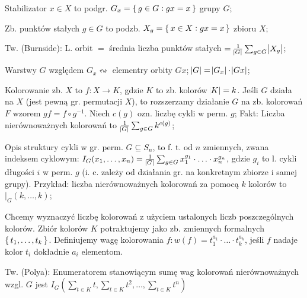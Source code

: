 Stabilizator $x \in X$ to podgr. $G_x = \set{g\in G: gx = x}$ grupy $G$;

Zb. punktów stałych $g \in G$ to podzb. $X_g = \set{x\in X: gx=x}$ zbioru $X$;

Tw. (Burnside): L. orbit $=$ średnia liczba punktów stałych
  $=\frac{1}{\abs{G}}\sum_{g\in G}\abs{X_g}$;

Warstwy $G$ względem $G_x \leftrightsquigarrow$ elementry orbity $Gx$;
$\abs{G} = \abs{G_x} \cdot \abs{Gx}$;

Kolorowanie zb. $X$ to $f: X\rightarrow K$, gdzie $K$ to zb. kolorów
  $\abs{K} = k$. Jeśli $G$ działa na $X$ (jest pewną gr. permutacji $X$), to
  rozszerzamy działanie $G$ na zb. kolorowań $F$ wzorem $gf=f\circ g^{-1}$.
  Niech $c(g)$ ozn. liczbę cykli w perm. $g$; Fakt: Liczba nierównoważnych
  kolorowań to $\frac{1}{\abs{G}}\sum_{g\in G}k^{c(g)}$;

Opis struktury cykli w gr. perm. $G \subseteq S_n$, to f. t. od $n$ zmiennych,
  zwana indeksem cyklowym: $I_G(x_1,\ldots,x_n)=
  \frac{1}{\abs{G}}\sum_{g\in G}x_1^{g_1}\cdot\ldots\cdot x_n^{g_n}$, gdzie
  $g_i$ to l. cykli długości $i$ w perm. $g$ (i. c. zależy od działania gr.
  na konkretnym zbiorze i samej grupy). Przykład: liczba nierównoważnych
  kolorowań za pomocą $k$ kolorów to $|_G(k,\ldots,k)$;

Chcemy wyznaczyć liczbę kolorowań z użyciem ustalonych liczb
  poszczególnych kolorów. Zbiór kolorów $K$ potraktujemy jako zb. zmiennych
  formalnych $\set{t_1,\ldots,t_k}$. Definiujemy wagę kolorowania
  $f: w(f) = t_1^{a_1}\cdot\ldots\cdot t_k^{a_k}$, jeśli $f$ nadaje kolor $t_i$
  dokładnie $a_i$ elementom.

Tw. (Polya): Enumeratorem stanowiącym sumę wag kolorowań nierównoważnych wzgl.
  $G$ jest $I_G(\sum_{t\in K}t, \sum_{t\in K}t^2, \ldots, \sum_{t\in K}t^n)$
